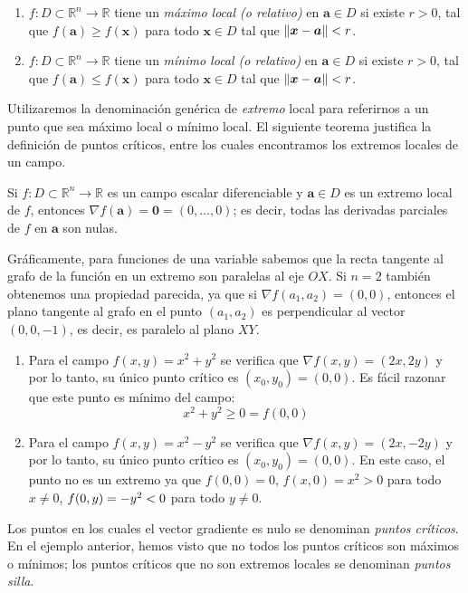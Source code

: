 \begin{definicion-br}
\begin{enumerate}
\item
$f\colon \mathit{D}\subset\mathbb{R}^n\to\mathbb{R}$ tiene un
\emph{máximo local (o relativo)} en $\boldsymbol{a}\in \mathit{D}$ si existe $r>0$, tal que $f(\boldsymbol{a})\geq f(\boldsymbol{x})$ para todo $\boldsymbol{x}\in D$ tal que $\|\boldsymbol x-\boldsymbol{a}\|< r$.
\item
$f\colon \mathit{D}\subset\mathbb{R}^n\to\mathbb{R}$ tiene un
\emph{mínimo local (o relativo)} en $\boldsymbol{a}\in \mathit{D}$ si existe
$r>0$, tal que $f(\boldsymbol{a})\leq f(\boldsymbol{x})$ para todo $\boldsymbol{x}\in D$ tal que $\|\boldsymbol x-\boldsymbol{a}\|< r$.
\end{enumerate}
\end{definicion-br}
%
Utilizaremos la denominación genérica de \emph{extremo} local para referirnos a un punto que sea máximo local o mínimo local.
El siguiente teorema justifica la definición de puntos críticos, entre los cuales encontramos los extremos locales de un campo.
%
\begin{teorema}\label{teo:crit}
Si $f\colon \mathit{D}\subset\mathbb{R}^n\to\mathbb{R}$ es un campo escalar diferenciable y $\boldsymbol{a}\in \mathit{D}$ es un extremo local de $f$, entonces $\nabla f(\boldsymbol a)=\boldsymbol 0=(0,\dots,0)$;
es decir, todas las derivadas parciales de $f$ en  $\boldsymbol{a}$ son nulas.
\end{teorema}
%
Gráficamente, para funciones de una variable sabemos que la recta tangente al grafo de la función en un extremo son paralelas al eje $OX$.
Si $n=2$ también obtenemos una propiedad parecida, ya que si $\nabla f(a_1,a_2)=(0,0)$, entonces el plano tangente al grafo en el punto $(a_1,a_2)$ es perpendicular al vector $(0,0,-1)$, es decir, es paralelo al plano $XY$.
%
\begin{ejemplo-br}\label{ej:x2-y2}
\begin{enumerate}
\item
Para el campo $f(x,y)=x^2+y^2$ se verifica que $\nabla f(x,y)=(2x,2y)$ y por lo tanto, su único punto crítico es $(x_0,y_0)=(0,0)$.
Es fácil razonar que este punto es mínimo del campo:
\[
x^2+y^2 \geq 0 =f(0,0)
\]
\item
Para el campo $f(x,y)=x^2-y^2$ se verifica que $\nabla f(x,y)=(2x,-2y)$ y por lo tanto, su único punto crítico es $(x_0,y_0)=(0,0)$.
En este caso, el punto no es un extremo ya que $f(0,0)=0$, $f(x,0)=x^2>0$ para todo $x\ne 0$, $f(0,y)=-y^2< 0$ para todo $y\ne 0$.\fej
\end{enumerate}
\end{ejemplo-br}
%
Los puntos en los cuales el vector gradiente es nulo se denominan \emph{puntos críticos}.
En el ejemplo anterior, hemos visto que no todos los puntos críticos son máximos o mínimos; los puntos críticos que no son extremos locales se denominan \emph{puntos silla}.

